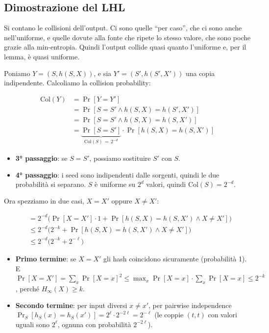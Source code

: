 \subsection{Dimostrazione del LHL}

\begin{inbreve}

Si contano le collisioni dell'output. Ci sono quelle ``per caso'', che ci sono anche nell'uniforme, e quelle dovute alla fonte che ripete lo stesso valore, che sono poche grazie alla min-entropia. Quindi l'output collide quasi quanto l'uniforme e, per il lemma, è quasi uniforme.

\end{inbreve}

Poniamo \(Y = (S, h(S, X))\), e sia \(Y' = (S', h(S', X'))\) una copia indipendente. Calcoliamo la collision probability:

\[
\begin{aligned}
\text{Col}(Y) &= \Pr[Y = Y'] \\
&= \Pr[S = S' \wedge h(S, X) = h(S', X')] \\
&= \Pr[S = S' \wedge h(S, X) = h(S, X')] \\
&= \underbrace{\Pr[S = S']}_{\text{Col}(S) \,=\, 2^{-d}} \cdot \Pr[h(S, X) = h(S, X')]
\end{aligned}
\]

\begin{itemize}
\tightlist
\item
  \textbf{3° passaggio}: se \(S = S'\), possiamo sostituire \(S'\) con \(S\).
\item
  \textbf{4° passaggio}: i seed sono indipendenti dalle sorgenti, quindi le due probabilità si separano. \(S\) è uniforme su \(2^d\) valori, quindi \(\text{Col}(S) = 2^{-d}\).
\end{itemize}

Ora spezziamo in due casi, \(X = X'\) oppure \(X \ne X'\):

\[
\begin{aligned}
&= 2^{-d} \Big( \Pr[X = X'] \cdot 1 + \Pr[h(S, X) = h(S, X') \wedge X \ne X'] \Big) \\
&\le 2^{-d} \Big( 2^{-k} + \Pr[h(S, X) = h(S, X') \wedge X \ne X'] \Big) \\
&\le 2^{-d} \Big( 2^{-k} + 2^{-\ell} \Big)
\end{aligned}
\]

\begin{itemize}
\tightlist
\item
  \textbf{Primo termine}: se \(X = X'\) gli hash coincidono sicuramente (probabilità 1). E \(\Pr[X = X'] = \sum_x \Pr[X = x]^2 \le \max_x \Pr[X = x] \cdot \sum_x \Pr[X = x] \le 2^{-k}\), perché \(H_\infty(X) \ge k\).
\item
  \textbf{Secondo termine}: per input diversi \(x \ne x'\), per pairwise independence \(\Pr_S[h_S(x) = h_S(x')] = 2^\ell \cdot 2^{-2\ell} = 2^{-\ell}\) (le coppie \((t, t)\) con valori uguali sono \(2^\ell\), ognuna con probabilità \(2^{-2\ell}\)).
\end{itemize}


